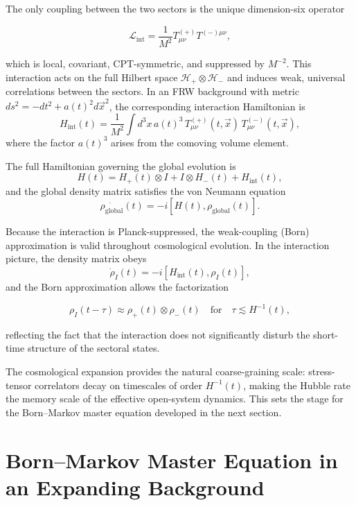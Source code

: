 \documentclass[11pt,a4paper]{article}
\newcommand{\Hglobal}{\mathcal{H}_+ \otimes \mathcal{H}_-}
\newcommand{\rglobal}{\rho_{\mathrm{global}}}
\newcommand{\rplus}{\rho_+}
\newcommand{\rminus}{\rho_-}
\newcommand{\Tplus}{T^{(+)}_{\mu\nu}}
\newcommand{\Tminus}{T^{(-)}_{\mu\nu}}
\newcommand{\Hint}{H_{\mathrm{int}}}
\newcommand{\LintDef}{\mathcal{L}_{\mathrm{int}} = \frac{1}{M^2} T^{(+)}_{\mu\nu} T^{(-)\mu\nu}}
\begin{document}
The only coupling between the two sectors is the unique dimension-six operator


\[
\LintDef,
\]


which is local, covariant, CPT-symmetric, and suppressed by \(M^{-2}\). This
interaction acts on the full Hilbert space \(\Hglobal\) and induces weak,
universal correlations between the sectors. In an FRW background with metric
\(ds^{2} = -dt^{2} + a(t)^{2} d\vec{x}^{2}\), the corresponding interaction
Hamiltonian is
\begin{equation}
\Hint(t)
    = \frac{1}{M^{2}}
      \int d^{3}x\, a(t)^{3}\,
      \Tplus(t,\vec{x})\, \Tminus(t,\vec{x}),
\end{equation}
where the factor \(a(t)^{3}\) arises from the comoving volume element.

The full Hamiltonian governing the global evolution is
\begin{equation}
H(t)
    = H_{+}(t) \otimes I
    + I \otimes H_{-}(t)
    + \Hint(t),
\end{equation}
and the global density matrix satisfies the von Neumann equation
\begin{equation}
\dot{\rglobal}(t)
    = -i [H(t), \rglobal(t)].
\end{equation}

Because the interaction is Planck-suppressed, the weak-coupling (Born)
approximation is valid throughout cosmological evolution. In the interaction
picture, the density matrix obeys
\begin{equation}
\dot{\rho}_{I}(t)
    = -i [\Hint(t), \rho_{I}(t)],
\end{equation}
and the Born approximation allows the factorization


\[
\rho_{I}(t-\tau)
    \approx \rplus(t) \otimes \rminus(t)
\quad\text{for}\quad
\tau \lesssim H^{-1}(t),
\]


reflecting the fact that the interaction does not significantly disturb the
short-time structure of the sectoral states.

The cosmological expansion provides the natural coarse-graining scale: stress-
tensor correlators decay on timescales of order \(H^{-1}(t)\), making the Hubble
rate the memory scale of the effective open-system dynamics. This sets the stage
for the Born--Markov master equation developed in the next section.

\section{Born--Markov Master Equation in an Expanding Background}
\end{document}
